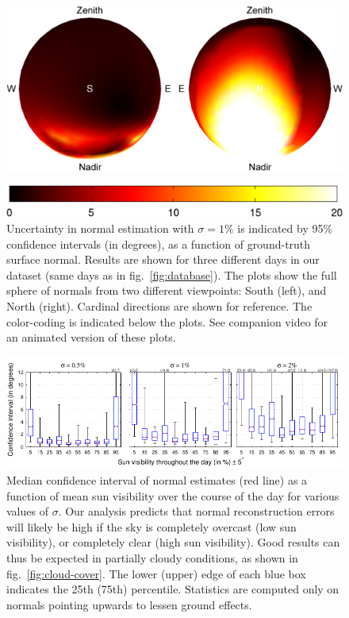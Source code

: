\begin{figure}[t]
\begin{minipage}{.5\linewidth}
    \includegraphics[width=.9\linewidth]{./figures/confidenceIntervals/20141108_10pm.png} \\
    \end{minipage}
    \vspace{3mm}
    \includegraphics[width=.51\linewidth]{./figures/confidenceIntervals/colorbar.png}
    \caption[Uncertainty in normal estimation in function of sun visibility]{Uncertainty in normal estimation with $\sigma=1\%$ is indicated by 95\% confidence intervals (in degrees), as a function of ground-truth surface normal. Results are shown for three different days in our dataset (same days as in fig.~\ref{fig:database}). The plots show the full sphere of normals from two different viewpoints: South (left), and North (right). Cardinal directions are shown for reference. The color-coding is indicated below the plots. See companion video for an animated version of these plots.}
    \label{fig:confidence-intervals}
\end{figure}

\begin{figure}[t]
    \centering
    \includegraphics[width=.99\linewidth]{./figures/confidenceIntervals/sunVisibilityPlot-topHemisphere.pdf}
    \vspace{-2mm}
    \caption[Confidence interval of normal estimates in function of sun visibility]{Median confidence interval of normal estimates (red line) as a function of mean sun visibility over the course of the day for various values of $\sigma$. Our analysis predicts that normal reconstruction errors will likely be high if the sky is completely overcast (low sun visibility), or completely clear (high sun visibility). Good results can thus be expected in partially cloudy conditions, as shown in fig.~\ref{fig:cloud-cover}. The lower (upper) edge of each blue box indicates the 25th (75th) percentile. Statistics are computed only on normals pointing upwards to lessen ground effects.}
    \label{fig:cloud-cover-plot}
\end{figure}


